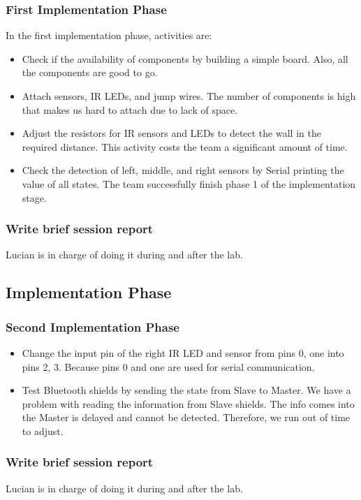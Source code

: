 \documentclass{article}
\begin{document}
\subsubsection{First Implementation Phase}
In the first implementation phase, activities are:
\begin{itemize}
	\item Check if the availability of components by building a simple board. Also, all the components are good to go.
	\item Attach sensors, IR LEDs, and jump wires. The number of components is high that makes us hard to attach due to lack of space.
	\item Adjust the resistors for IR sensors and LEDs to detect the wall in the required distance. This activity costs the team a significant amount of time.
	\item Check the detection of left, middle, and right sensors by Serial printing the value of all states. The team successfully finish phase 1 of the implementation stage.
\end{itemize}

\subsubsection{Write brief session report}
Lucian is in charge of doing it during and after the lab.

\subsection{Implementation Phase}

\subsubsection{Second Implementation Phase}
\begin{itemize}
    \item Change the input pin of the right IR LED and sensor from pins 0, one into pins 2, 3. Because pins 0 and one are used for serial communication.
    \item Test Bluetooth shields by sending the state from Slave to Master. We have a problem with reading the information from Slave shields. The info comes into the Master is delayed and cannot be detected. Therefore, we run out of time to adjust.
\end{itemize}

\subsubsection{Write brief session report}
Lucian is in charge of doing it during and after the lab.
\end{document}
